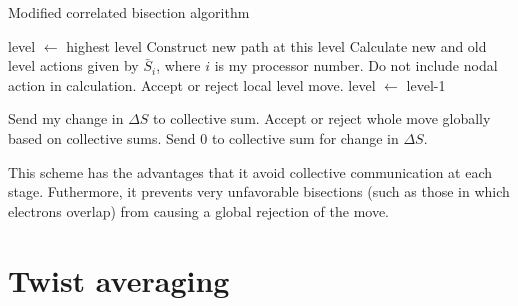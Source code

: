 \documentclass{article}
\begin{document}
\begin{algorithm}
\caption{Modified correlated bisection algorithm}
\begin{algorithmic}
\STATE level $\leftarrow$ highest level
  \STATE Construct new path at this level
  \STATE Calculate new and old level actions given by $\bar{S}_i$, 
  where $i$ is my processor number.  Do not include nodal action in
  calculation.
  \STATE Accept or reject local level move.
  \STATE level $\leftarrow$ level-1
\ENDWHILE

  \STATE Send my change in $\Delta S$ to collective sum.
  \STATE Accept or reject whole move globally based on collective sums.
\ELSE
  \STATE Send 0 to collective sum for change in $\Delta S$.
\ENDIF

\end{algorithmic}
\end{algorithm}

This scheme has the advantages that it avoid collective communication
at each stage.  Futhermore, it prevents very unfavorable bisections
(such as those in which electrons overlap) from causing a global
rejection of the move.




\section{Twist averaging}
\end{document}
